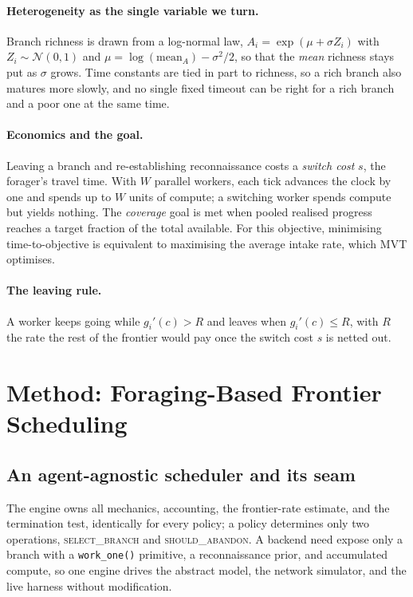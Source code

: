 \documentclass[runningheads]{llncs}
\newcommand{\RR}{R}
\begin{document}
\paragraph{Heterogeneity as the single variable we turn.}
Branch richness is drawn from a log-normal law, $A_i = \exp(\mu + \sigma Z_i)$ with
$Z_i\sim\mathcal{N}(0,1)$ and $\mu = \log(\text{mean}_A) - \sigma^2/2$, so that the
\emph{mean} richness stays put as $\sigma$ grows. Time constants are tied in part to richness, so a
rich branch also matures more slowly, and no single fixed timeout can be right for a
rich branch and a poor one at the same time.

\paragraph{Economics and the goal.}
Leaving a branch and re-establishing reconnaissance costs a \emph{switch cost} $s$, the
forager's travel time. With $W$ parallel workers, each tick advances the clock by one and
spends up to $W$ units of compute; a switching worker spends compute but yields nothing.
The \emph{coverage} goal is met when pooled realised progress reaches a target fraction of
the total available. For this objective, minimising time-to-objective is equivalent to
maximising the average intake rate, which MVT optimises.

\paragraph{The leaving rule.}
A worker keeps going while $g_i'(c) > \RR$ and leaves when $g_i'(c) \le \RR$, with $\RR$
the rate the rest of the frontier would pay once the switch cost $s$ is netted out.

\section{Method: Foraging-Based Frontier Scheduling}
\label{sec:method}

\subsection{An agent-agnostic scheduler and its seam}
The engine owns
all mechanics, accounting, the frontier-rate estimate, and the termination test,
identically for every policy; a policy determines only two operations,
\textsc{select\_branch} and \textsc{should\_abandon}. A backend need expose
only a branch with a \texttt{work\_one()} primitive, a reconnaissance prior, and
accumulated compute, so one engine drives the abstract model, the network simulator, and
the live harness without modification.
\end{document}
